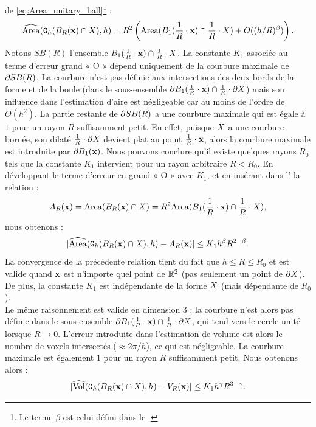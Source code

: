 de \ref{eq:Area_unitary_ball}\footnote{Le terme $\beta$ est celui défini dans le .} :
\begin{equation}
  \label{eq:Area_unitary_ball_shape}
  \AreaC(\DigF{\Ball{R}{\vx} \cap \Shape}{h}, h) = R^2 \left(\Area( \Ball{1}{\frac{1}{R} \cdot \vx} \cap \frac{1}{R} \cdot \Shape) + O( (h/R)^\beta) \right).
\end{equation}
%
Notons $SB(R)$ l'ensemble $\Ball{1}{\frac{1}{R} \cdot \vx} \cap \frac{1}{R} \cdot
\Shape$. La constante $K_1$ associée au terme d'erreur grand « O » dépend
uniquement de la courbure maximale de $\BT SB(R)$. La courbure n'est pas définie
aux intersections des deux bords de la forme et de la boule (dans le
sous-ensemble $\BT \Ball{1}{\frac{1}{R} \cdot \vx} \cap \frac{1}{R} \cdot \dS$) mais
son influence dans l'estimation d'aire est négligeable car au moins de l'ordre
de $O(h^2)$. La partie restante de $\BT SB(R)$ a une courbure maximale qui est
égale à $1$ pour un rayon $R$ suffisamment petit. En effet, puisque $\Shape$ a
une courbure bornée, son dilaté $\frac{1}{R} \cdot \dS$ devient plat au point
$\frac{1}{R} \cdot \vx$, alors la courbure maximale est introduite par $\BT
\Ball{1}{\vx}$. Nous pouvons conclure qu'il existe quelques rayons $R_0$ tels que la
constante $K_1$ intervient pour un rayon arbitraire $R < R_0$. En développant le
terme d'erreur en grand « O » avec $K_1$, et en insérant dans
l' la relation :
%
\begin{equation}
  A_R(\vx) = \Area( \Ball{R}{\vx} \cap \Shape ) = R^2 \Area( \Ball{1}{\frac{1}{R} \cdot \vx} \cap \frac{1}{R} \cdot \Shape),
\end{equation}
%
nous obtenons :
%
\begin{equation}\label{eq:convergence-area-intersection}
  | \AreaC(\DigF{\Ball{R}{\vx} \cap \Shape}{h}, h) - A_R(\vx) | \le K_1 h^\beta R^{2-\beta}.
\end{equation}
%
La convergence de la précédente relation tient du fait que $h \le R \le R_0$ et
est valide quand $\vx$ est n'importe quel point de $\R^2$ (pas seulement un
point de $\dS$). De plus, la constante $K_1$ est indépendante de la forme
$\Shape$ (mais dépendante de $R_0$).\\
%
Le même raisonnement est valide en dimension 3 : la courbure n'est alors pas
définie dans le sous-ensemble $\BT \Ball{1}{\frac{1}{R} \cdot \vx} \cap \frac{1}{R}
\cdot \dS$, qui tend vers le cercle unité lorsque $R \rightarrow 0$. L'erreur
introduite dans l'estimation de volume est alors le nombre de voxels intersectés
($\approx 2\pi/h$), ce qui est négligeable. La courbure maximale est également
$1$ pour un rayon $R$ suffisamment petit. Nous obtenons alors :
%
\begin{equation}\label{eq:convergence-volume-intersection}
  | \VolC(\DigF{\Ball{R}{\vx} \cap \Shape}{h}, h) - V_R(\vx) | \le K_1 h^\gamma R^{3-\gamma}.
\end{equation}
%
